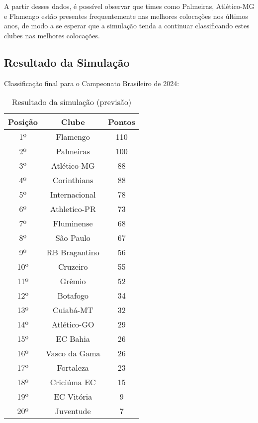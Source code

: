 \documentclass[conference]{IEEEtran}
\begin{document}
\indent A partir desses dados, é possível observar que times como Palmeiras, Atlético-MG 
e Flamengo estão presentes frequentemente nas melhores colocações nos últimos 
anos, de modo a se esperar que a simulação tenda a continuar classificando estes 
clubes nas melhores colocações. 

\subsection{Resultado da Simulação}
\indent Classificação final para o Campeonato Brasileiro de 2024:

\begin{table}[htbp]
    \caption{Resultado da simulação (previsão)}
    \begin{center}
        \begin{tabular}{|c|c|c|}
        \cline{1-3}
        \textbf{Posição} & \textbf{Clube} & \textbf{Pontos}\\
        \hline
        1º & Flamengo & 110\\
        \hline
        2º & Palmeiras & 100\\
        \hline
        3º & Atlético-MG & 88\\
        \hline
        4º & Corinthians & 88\\
        \hline
        5º & Internacional & 78\\
        \hline
        6º & Athletico-PR & 73\\
        \hline
        7º & Fluminense & 68\\
        \hline
        8º & São Paulo & 67\\
        \hline
        9º & RB Bragantino & 56\\
        \hline
        10º & Cruzeiro & 55\\
        \hline
        11º & Grêmio & 52\\
        \hline
        12º & Botafogo & 34\\
        \hline
        13º & Cuiabá-MT & 32\\
        \hline
        14º & Atlético-GO & 29\\
        \hline
        15º & EC Bahia & 26\\
        \hline
        16º & Vasco da Gama & 26\\
        \hline
        17º & Fortaleza & 23\\
        \hline
        18º & Criciúma EC & 15\\
        \hline
        19º & EC Vitória & 9\\
        \hline
        20º & Juventude & 7\\
        \hline
    \end{tabular}
    \label{tab2}
    \end{center}
\end{table}
\end{document}

